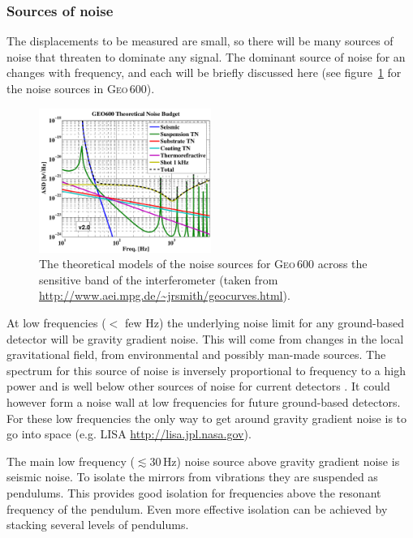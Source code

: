 \subsubsection{Sources of noise}
The displacements to be measured are small, so there will be many sources of noise that threaten
to dominate any \gw signal. The dominant source of noise for an \ifo changes with frequency, and
each will be briefly discussed here (see figure~\ref{geonoisesources} for the noise sources in
G\textsc{eo}\,600).
\begin{figure}[!htbp]
\begin{center}
\includegraphics[width=0.5\textwidth]{figs/geo_noise_sources_1000}\caption[Theoretical noise
sources for G\textsc{eo}\,600.]{The theoretical models of the noise sources for G\textsc{eo}\,600
across the sensitive band of the interferometer (taken from
\url{http://www.aei.mpg.de/\~jrsmith/geocurves.html}).}\label{geonoisesources}
\end{center}
\end{figure}

At low frequencies ($<$ few Hz) the underlying noise limit for any ground-based detector will be
gravity gradient noise. This will come from changes in the local gravitational field, from
environmental and possibly man-made sources. The spectrum for this source of noise is inversely
proportional to frequency to a high power and is well below other sources of noise for current
detectors \cite{Schutz:1999}. It could however form a noise wall at low frequencies for future
ground-based detectors. For these low frequencies the only way to get around gravity gradient noise
is to go into space (e.g. LISA \url{http://lisa.jpl.nasa.gov}).

The main low frequency ($\lesssim 30\,$Hz) noise source above gravity gradient noise is seismic
noise. To isolate the mirrors from vibrations they are suspended as pendulums. This provides good
isolation for frequencies above the resonant frequency of the pendulum. Even more effective
isolation can be achieved by stacking several levels of pendulums.

